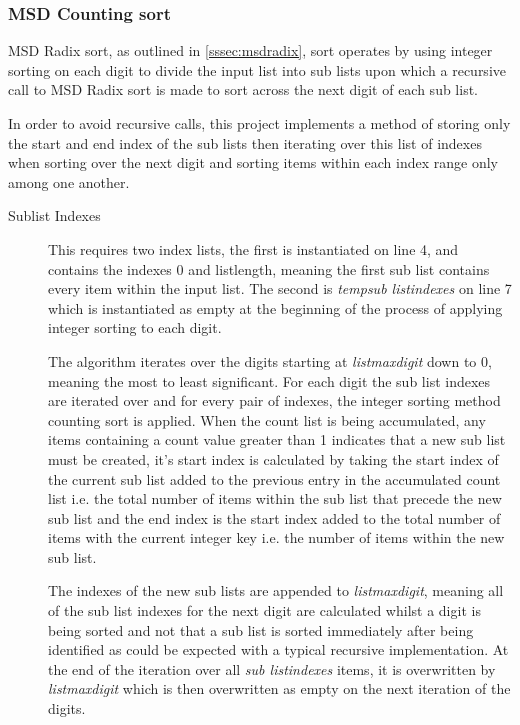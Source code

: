 \documentclass[12pt]{article}
\begin{document}
\subsubsection{MSD Counting sort}
MSD Radix sort, as outlined in \ref{sssec:msdradix}, sort operates by using integer sorting on each digit to divide the input list into sub lists upon which a recursive call to MSD Radix sort is made to sort across the next digit of each sub list.
\par In order to avoid recursive calls, this project implements a method of storing only the start and end index of the sub lists then iterating over this list of indexes when sorting over the next digit and sorting items within each index range only among one another.
\begin{description}
	\item[Sublist Indexes] 
	\par 
	This requires two index lists, the first is instantiated on line 4, and contains the indexes 0 and list\textunderscore length, meaning the first sub list contains every item within the input list. The second is \textit{temp\textunderscore sub list\textunderscore indexes} on line 7 which is instantiated as empty at the beginning of the process of applying integer sorting to each digit.
	\par
	The algorithm iterates over the digits starting at \textit{list\textunderscore max\textunderscore digit} down to 0, meaning the most to least significant. For each digit the sub list indexes are iterated over and for every pair of indexes, the integer sorting method counting sort is applied. When the count list is being accumulated, any items containing a count value greater than 1 indicates that a new sub list must be created, it's start index is calculated by taking the start index of the current sub list added to the previous entry in the accumulated count list i.e. the total number of items within the sub list that precede the new sub list and the end index is the start index added to the total number of items with the current integer key i.e. the number of items within the new sub list.
	\par The indexes of the new sub lists are appended to \textit{list\textunderscore max\textunderscore digit}, meaning all of the sub list indexes for the next digit are calculated whilst a digit is being sorted and not that a sub list is sorted immediately after being identified as could be expected with a typical recursive implementation. At the end of the iteration over all \textit{sub list\textunderscore indexes} items, it is overwritten by \textit{list\textunderscore max\textunderscore digit} which is then overwritten as empty on the next iteration of the digits.

\end{description}
\end{document}
